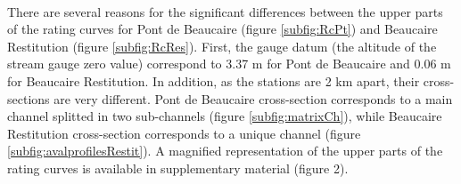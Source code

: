 \documentclass[11pt]{article}
\begin{document}
    \paragraph{}
There are several reasons for the significant differences between the upper parts of the rating curves for Pont de Beaucaire (figure \ref{subfig:RcPt}) and Beaucaire Restitution (figure \ref{subfig:RcRes}). First, the gauge datum (the altitude of the stream gauge zero value) correspond to 3.37 m for Pont de Beaucaire and 0.06 m for Beaucaire Restitution. In addition, as the stations are 2 km apart, their cross-sections are very different. Pont de Beaucaire cross-section corresponds to a main channel splitted in two sub-channels (figure \ref{subfig:matrixCh}), while Beaucaire Restitution cross-section corresponds to a unique channel (figure \ref{subfig:avalprofilesRestit}). A magnified representation of the upper parts of the rating curves is available in supplementary material (figure 2).
	
\end{document}
